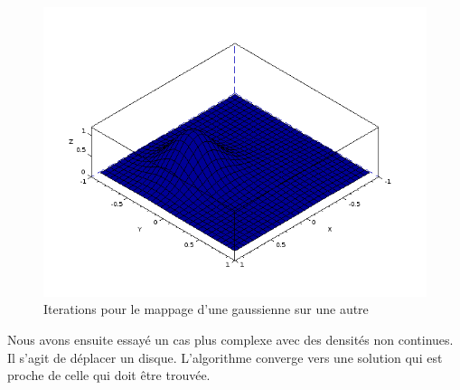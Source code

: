 \documentclass[12pt,a4paper,twoside]{article}
\begin{document}
\begin{figure}
\begin{center}
\includegraphics[scale=0.35]{Images/deplace4.png}
\caption{Iterations pour le mappage d'une gaussienne sur une autre}
\label{iterationsg2}
\end{center}
\end{figure}

Nous avons ensuite essayé un cas plus complexe avec des densités non continues. Il s'agit de déplacer un disque.
L'algorithme converge vers une solution qui est proche de celle qui doit être trouvée.
\end{document}
